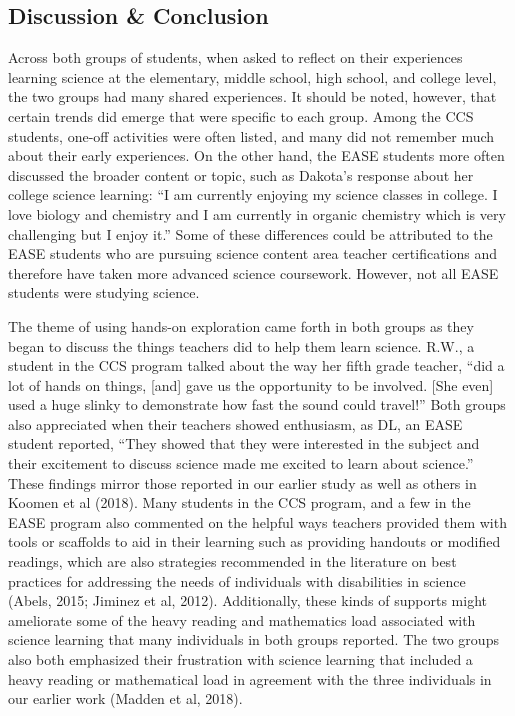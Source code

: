 \documentclass[11pt]{sig-alternate}
\begin{document}
\begin{large}
\section*{Discussion \& Conclusion}
Across both groups of students, when asked to reflect on their experiences learning science at the elementary, middle school, high school, and college level, the two groups had many shared experiences. It should be noted, however, that certain trends did emerge that were specific to each group. Among the CCS students, one-off activities were often listed, and many did not remember much about their early experiences. On the other hand, the EASE students more often discussed the broader content or topic, such as Dakota’s response about her college science learning: “I am currently enjoying my science classes in college. I love biology and chemistry and I am currently in organic chemistry which is very challenging but I enjoy it.” Some of these differences could be attributed to the EASE students who are pursuing science content area teacher certifications and therefore have taken more advanced science coursework. However, not all EASE students were studying science. 

The theme of using hands-on exploration came forth in both groups as they began to discuss the things teachers did to help them learn science. R.W., a student in the CCS program talked about the way her fifth grade teacher, “did a lot of hands on things, [and] gave us the opportunity to be involved. [She even] used a huge slinky to demonstrate how fast the sound could travel!” Both groups also appreciated when their teachers showed enthusiasm, as DL, an EASE student reported, “They showed that they were interested in the subject and their excitement to discuss science made me excited to learn about science.” These findings mirror those reported in our earlier study as well as others in Koomen et al (2018). Many students in the CCS program, and a few in the EASE program also commented on the helpful ways teachers provided them with tools or scaffolds to aid in their learning such as providing handouts or modified readings, which are also strategies recommended in the literature on best practices for addressing the needs of individuals with disabilities in science (Abels, 2015; Jiminez et al, 2012). Additionally, these kinds of supports might ameliorate some of the heavy reading and mathematics load associated with science learning that many individuals in both groups reported. The two groups also both emphasized their frustration with science learning that included a heavy reading or mathematical load in agreement with the three individuals in our earlier work (Madden et al, 2018).


\end{large}
\end{document}
